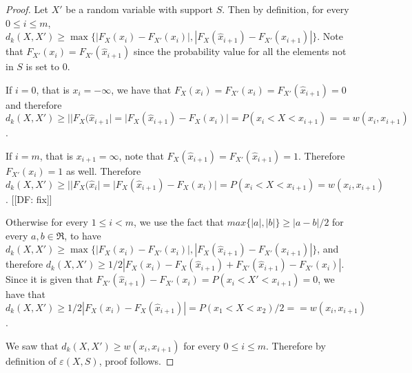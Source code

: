 \documentclass{article}
\begin{document}
\begin{proof}
	
	
	Let $X'$ be a random variable with support $S$. Then by definition, for every $0\leq i\leq m$, $d_k(X,X') \geq \max \{|F_X(x_i) - F_{X'}(x_i)|, |F_X(\hat x_{i+1}) - F_{X'}(\hat x_{i+1})| \}$. Note that $F_{X'}(x_i)=F_{X'}(\hat x_{i+1})$ since the probability value for all the elements not in $S$ is set to $0$.
	
	If $i=0$, that is $x_i=-\infty$, we have that $F_X(x_i)=F_{X'}(x_i)=F_{X'}(\hat x_{i+1})=0$ and therefore $d_k(X,X') \geq ||F_X(\hat x_{i+1}| = |F_X(\hat x_{i+1}) - F_{X}(x_i)| =  P(x_i < X < x_{i+1})== w(x_i,x_{i+1})$.
	
	If $i =m$, that is $x_{i+1}=\infty$, note that $F_{X}(\hat x_{i+1})=F_{X'}(\hat x_{i+1})=1$. Therefore $F_{X'}(x_i)=1$ as well.
	Therefore $d_k(X,X') \geq ||F_X(\hat x_i| = |F_X(\hat x_{i+1}) - F_{X}(x_i)| =  P(x_i < X < x_{i+1}) = w(x_i,x_{i+1})$. [[DF: fix]]
	
	
	Otherwise for every $1\leq i< m$,  we use the fact that $max\{|a|,|b|\} \geq |a-b|/2$ for every $a,b\in\Re$, to have  $d_k(X,X') \geq \max \{|F_X(x_i) - F_{X'}(x_i)|, |F_X(\hat x_{i+1}) - F_{X'}(\hat x_{i+1})| \}$, and therefore $d_k(X,X') \geq 1/2|F_X(x_i) - F_X(\hat x_{i+1}) + F_{X'}(\hat x_{i+1}) - F_{X'}(x_i)|$. Since it is given that $F_{X'}(\hat x_{i+1}) - F_{X'}(x_i) = P(x_i < X' < x_{i+1})=0$, we have that $d_k(X,X') \geq 1/2|F_X(x_i) - F_X(\hat x_{i+1}) | =P(x_1 < X < x_2)/2 == w(x_i,x_{i+1})$. 
	
	We saw that $d_k(X,X') \geq  w(x_i,x_{i+1})$ for every $0\leq i\leq m$. Therefore by definition of $\varepsilon(X,S)$, proof follows.
\end{proof}
\end{document}
